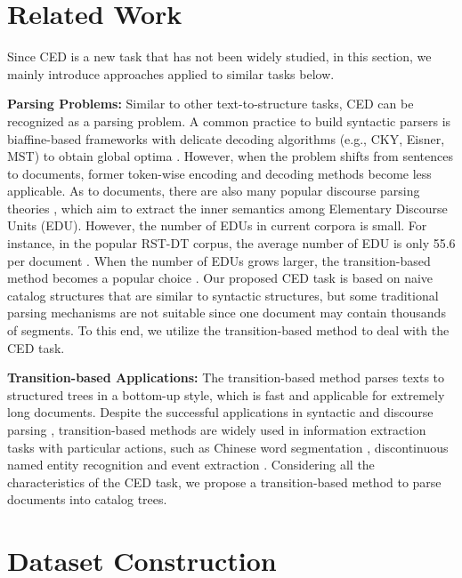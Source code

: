 \documentclass[runningheads]{llncs}
\begin{document}
 \section{Related Work}

Since CED is a new task that has not been widely studied, in this section, we mainly introduce approaches applied to similar tasks below.

\textbf{Parsing Problems:}
Similar to other text-to-structure tasks, CED can be recognized as a parsing problem.
A common practice to build syntactic parsers is biaffine-based frameworks with delicate decoding algorithms (e.g., CKY, Eisner, MST) to obtain global optima \cite{biaffine,zhang-etal-2020-treecrf}.
However, when the problem shifts from sentences to documents, former token-wise encoding and decoding methods become less applicable.
As to documents, there are also many popular discourse parsing theories \cite{kamp2013discourse,rhetorical-theory,Theme-rheme}, which aim to extract the inner semantics among Elementary Discourse Units (EDU).
However, the number of EDUs in current corpora is small.
For instance, in the popular RST-DT corpus, the average number of EDU is only 55.6 per document \cite{zhang_top-down_2020}.
When the number of EDUs grows larger, the transition-based method becomes a popular choice \cite{ji-eisenstein-2014-representation}.
Our proposed CED task is based on naive catalog structures that are similar to syntactic structures, but some traditional parsing mechanisms are not suitable since one document may contain thousands of segments.
To this end, we utilize the transition-based method to deal with the CED task.

\textbf{Transition-based Applications:}
The transition-based method parses texts to structured trees in a bottom-up style, which is fast and applicable for extremely long documents.
Despite the successful applications in syntactic and discourse parsing \cite{zhu2013fast,ji-eisenstein-2014-representation,dyer2015transition}, transition-based methods are widely used in information extraction tasks with particular actions, such as Chinese word segmentation \cite{zhang2016transition}, discontinuous named entity recognition \cite{dai-etal-2020-effective} and event extraction \cite{transition-based-ner-events}.
Considering all the characteristics of the CED task, we propose a transition-based method to parse documents into catalog trees.
 \section{Dataset Construction}
\end{document}
